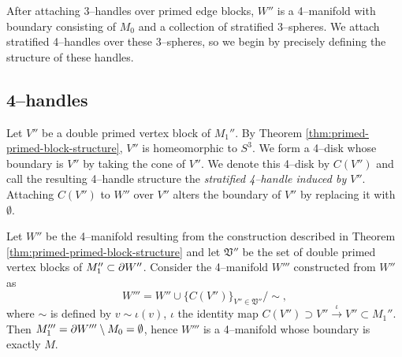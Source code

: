 After attaching 3--handles over primed edge blocks, $W''$ is a 4--manifold with boundary consisting of $M_0$ and a collection of stratified 3--spheres.
We attach stratified 4--handles over these 3--spheres, so we begin by precisely defining the structure of these handles.

\subsection{4--handles}
Let $V''$ be a double primed vertex block of $M_1''$.
By Theorem \ref{thm:primed-primed-block-structure}, $V''$ is homeomorphic to $S^3$.
We form a 4--disk whose boundary is $V''$ by taking the cone of $V''$.
We denote this 4--disk by $C(V'')$ and call the resulting 4--handle structure the \emph{stratified 4--handle induced by $V''$}.
Attaching $C(V'')$ to $W''$ over $V''$ alters the boundary of $V''$ by replacing it with $\emptyset$.

\begin{cor}
	Let $W''$ be the 4--manifold resulting from the construction described in Theorem \ref{thm:primed-primed-block-structure} and let $\mathfrak{V}''$ be the set of double primed vertex blocks of $M_1''\subset\partial W''$.
	Consider the 4--manifold $W'''$ constructed from $W''$ as
	\[
	W''' = W''\cup\{C(V'')\}_{V''\in \mathfrak{V}''} / \sim,
	\]
	where $\sim$ is defined by $v\sim \iota(v)$, $\iota$ the identity map $C(V'')\supset V''\overset{\iota}{\to} V''\subset M_1''$.
	Then $M_1'''=\partial W'''\setminus M_0=\emptyset$, hence $W'''$ is a 4--manifold whose boundary is exactly $M$.
\end{cor}


